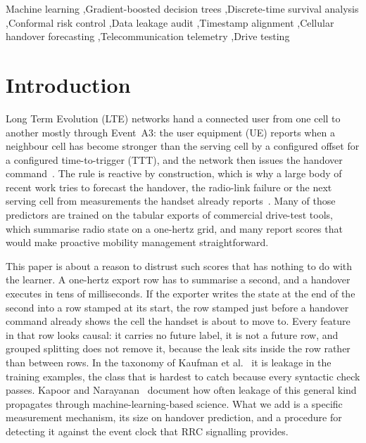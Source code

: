 \documentclass[5p,times,twocolumn]{elsarticle}
\begin{document}
\begin{frontmatter}
\begin{keyword}
Machine learning \sep Gradient-boosted decision trees \sep Discrete-time survival analysis \sep Conformal risk control \sep Data leakage audit \sep Timestamp alignment \sep Cellular handover forecasting \sep Telecommunication telemetry \sep Drive testing
\end{keyword}

\end{frontmatter}

\section{Introduction}
\label{sec:intro}

Long Term Evolution (LTE) networks hand a connected user from one cell to another mostly through Event~A3: the user equipment (UE) reports when a neighbour cell has become stronger than the serving cell by a configured offset for a configured time-to-trigger (TTT), and the network then issues the handover command~\cite{ref1}. The rule is reactive by construction, which is why a large body of recent work tries to forecast the handover, the radio-link failure or the next serving cell from measurements the handset already reports~\cite{ref7,ref8,ref9,ref54}. Many of those predictors are trained on the tabular exports of commercial drive-test tools, which summarise radio state on a one-hertz grid, and many report scores that would make proactive mobility management straightforward.

This paper is about a reason to distrust such scores that has nothing to do with the learner. A one-hertz export row has to summarise a second, and a handover executes in tens of milliseconds. If the exporter writes the state at the end of the second into a row stamped at its start, the row stamped just before a handover command already shows the cell the handset is about to move to. Every feature in that row looks causal: it carries no future label, it is not a future row, and grouped splitting does not remove it, because the leak sits inside the row rather than between rows. In the taxonomy of Kaufman et al.~\cite{ref36} it is leakage in the training examples, the class that is hardest to catch because every syntactic check passes. Kapoor and Narayanan~\cite{ref56} document how often leakage of this general kind propagates through machine-learning-based science. What we add is a specific measurement mechanism, its size on handover prediction, and a procedure for detecting it against the event clock that RRC signalling provides.
\end{document}
